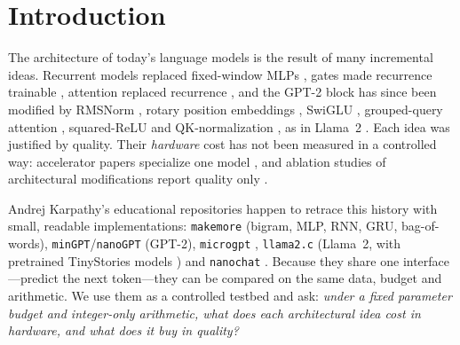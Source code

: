 \documentclass[conference]{IEEEtran}
\newcommand{\code}[1]{\texttt{#1}}
\begin{document}
\section{Introduction}
The architecture of today's language models is the result of many incremental ideas. Recurrent models replaced
fixed-window MLPs \cite{bengio2003neural,mikolov2010recurrent}, gates made recurrence trainable \cite{cho2014learning},
attention replaced recurrence \cite{vaswani2017attention}, and the GPT-2 block \cite{radford2019language} has since been
modified by RMSNorm \cite{zhang2019rmsnorm}, rotary position embeddings \cite{su2024roformer}, SwiGLU
\cite{shazeer2020glu}, grouped-query attention \cite{ainslie2023gqa}, squared-ReLU \cite{so2021primer} and
QK-normalization \cite{henry2020qknorm}, as in Llama~2 \cite{touvron2023llama2}. Each idea was justified by quality.
Their \emph{hardware} cost has not been measured in a controlled way: accelerator papers specialize one model
\cite{hong2022dfx,zeng2024flightllm,he2024hlstransform}, and ablation studies of architectural modifications report quality
only \cite{narang2021transformer}.

Andrej Karpathy's educational repositories happen to retrace this history with small, readable implementations:
\code{makemore} \cite{karpathy2022makemore} (bigram, MLP, RNN, GRU, bag-of-words), \code{minGPT}/\code{nanoGPT}
\cite{karpathy2020mingpt,karpathy2022nanogpt} (GPT-2), \code{microgpt} \cite{karpathy2026microgpt},
\code{llama2.c} \cite{karpathy2023llama2c} (Llama~2, with pretrained TinyStories \cite{eldan2023tinystories} models
\cite{karpathy2023tinyllamas}) and \code{nanochat} \cite{karpathy2025nanochat}. Because they share one interface---predict
the next token---they can be compared on the same data, budget and arithmetic. We use them as a controlled testbed and ask:
\emph{under a fixed parameter budget and integer-only arithmetic, what does each architectural idea cost in hardware, and
what does it buy in quality?}
\end{document}
